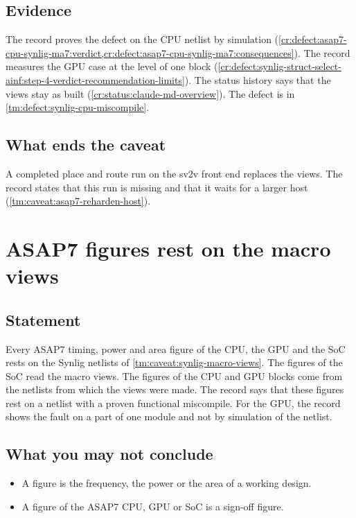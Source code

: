 \subsection*{Evidence}
The record proves the defect on the CPU netlist by simulation (\cref{cr:defect:asap7-cpu-synlig-ma7:verdict,cr:defect:asap7-cpu-synlig-ma7:consequences}). The record measures the GPU case at the level of one block (\cref{cr:defect:synlig-struct-select-ainf:step-4-verdict-recommendation-limits}). The status history says that the views stay as built (\cref{cr:status:claude-md-overview}). The defect is in \cref{tm:defect:synlig-cpu-miscompile}.

\subsection*{What ends the caveat}
A completed place and route run on the sv2v front end replaces the views. The record states that this run is missing and that it waits for a larger host (\cref{tm:caveat:asap7-reharden-host}).

\section{ASAP7 figures rest on the macro views}\label{tm:caveat:asap7-figures-rest-on-macro-views}
\subsection*{Statement}
Every ASAP7 timing, power and area figure of the CPU, the GPU and the SoC rests on the Synlig netlists of \cref{tm:caveat:synlig-macro-views}. The figures of the SoC read the macro views. The figures of the CPU and GPU blocks come from the netlists from which the views were made. The record says that these figures rest on a netlist with a proven functional miscompile. For the GPU, the record shows the fault on a part of one module and not by simulation of the netlist.

\subsection*{What you may not conclude}
\begin{itemize}
  \item A figure is the frequency, the power or the area of a working design.
  \item A figure of the ASAP7 CPU, GPU or SoC is a sign-off figure.
\end{itemize}

